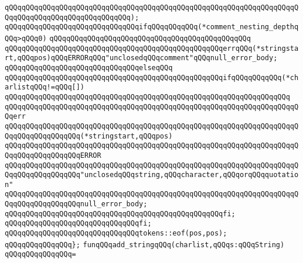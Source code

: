 \verb|qQQqqQQqqQQqqQQqqQQqqQQqqQQqqQQqqQQqqQQqqQQqqQQqqQQqqQQqqQQqqQQqqQQqqQQqqQQqqQQqqQQqqQQqqQQqqQQqqQQq);|\newline
\newline
\verb|qQQqqQQqqQQqqQQqqQQqqQQqqQQqqQQqifqQQqqQQqqQQq(*comment_nesting_depthqQQq>qQQq0)|\newline
\verb|qQQqqQQqqQQqqQQqqQQqqQQqqQQqqQQqqQQqqQQqqQQqqQQq|\newline
\verb|qQQqqQQqqQQqqQQqqQQqqQQqqQQqqQQqqQQqqQQqqQQqqQQqqQQqerrqQQq(*stringstart,qQQqpos)qQQqERRORqQQq"unclosedqQQqcomment"qQQqnull_error_body;|\newline
\verb|qQQqqQQqqQQqqQQqqQQqqQQqqQQqqQQqelseqQQq|\newline
\verb|qQQqqQQqqQQqqQQqqQQqqQQqqQQqqQQqqQQqqQQqqQQqqQQqqQQqifqQQqqQQqqQQq(*charlistqQQq!=qQQq[])|\newline
\verb|qQQqqQQqqQQqqQQqqQQqqQQqqQQqqQQqqQQqqQQqqQQqqQQqqQQqqQQqqQQqqQQqqQQq|\newline
\verb|qQQqqQQqqQQqqQQqqQQqqQQqqQQqqQQqqQQqqQQqqQQqqQQqqQQqqQQqqQQqqQQqqQQqqQQqerr|\newline
\verb|qQQqqQQqqQQqqQQqqQQqqQQqqQQqqQQqqQQqqQQqqQQqqQQqqQQqqQQqqQQqqQQqqQQqqQQqqQQqqQQqqQQqqQQq(*stringstart,qQQqpos)|\newline
\verb|qQQqqQQqqQQqqQQqqQQqqQQqqQQqqQQqqQQqqQQqqQQqqQQqqQQqqQQqqQQqqQQqqQQqqQQqqQQqqQQqqQQqqQQqERROR|\newline
\verb|qQQqqQQqqQQqqQQqqQQqqQQqqQQqqQQqqQQqqQQqqQQqqQQqqQQqqQQqqQQqqQQqqQQqqQQqqQQqqQQqqQQqqQQq"unclosedqQQqstring,qQQqcharacter,qQQqorqQQqquotation"|\newline
\verb|qQQqqQQqqQQqqQQqqQQqqQQqqQQqqQQqqQQqqQQqqQQqqQQqqQQqqQQqqQQqqQQqqQQqqQQqqQQqqQQqqQQqqQQqnull_error_body;|\newline
\newline
\verb|qQQqqQQqqQQqqQQqqQQqqQQqqQQqqQQqqQQqqQQqqQQqqQQqqQQqfi;|\newline
\verb|qQQqqQQqqQQqqQQqqQQqqQQqqQQqqQQqfi;|\newline
\newline
\newline
\verb|qQQqqQQqqQQqqQQqqQQqqQQqqQQqqQQqtokens::eof(pos,pos);|\newline
\verb|qQQqqQQqqQQqqQQq};|\newline
\newline
\newline
\verb|funqQQqadd_stringqQQq(charlist,qQQqs:qQQqString)|\newline
\verb|qQQqqQQqqQQqqQQq=|\newline
